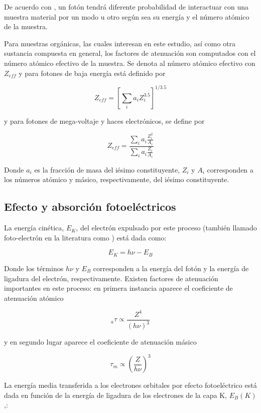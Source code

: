 \documentclass[12pt,letterpaper, oneside]{book}
\begin{document}
	 De acuerdo con \cite{IAEA.2005}, un fotón tendrá diferente probabilidad de interactuar con una muestra material por un modo u otro según sea su energía y el número atómico de la muestra. 
	 
	 Para muestras orgánicas, las cuales interesan en este estudio, así como otra sustancia compuesta en general, los factores de atenuación son computados con el número atómico efectivo de la muestra\cite{IAEA.2005}. Se denota al número atómico efectivo con $Z_{eff}$ y para fotones de baja energía está definido por
	 
	 \begin{equation}
	 	Z_{eff}=\left[\sum_{i}a_i Z_i^{3.5}\right]^{1/3.5}\label{numero_atomico_efectivo}
	 \end{equation}
	 
	 y para fotones de mega-voltaje y haces electrónicos, se define por
	 
	 \begin{equation}
	 	Z_{eff}=\frac{\sum_{i}a_i \frac{Z_i^2}{A_i}}{\sum_{i}a_i \frac{Z_i}{A_i}}
	 \end{equation}
	 
	 Donde $a_i$ es la fracción de masa del iésimo constituyente, $Z_i$ y $A_i$ corresponden a los números atómico y másico, respectivamente, del iésimo constituyente. 
	 
	 \subsection{Efecto y absorción fotoeléctricos}
	 La energía cinética, $E_K$, del electrón expulsado por este proceso (también llamado foto-electrón en la literatura como \cite{IAEA.2005,Mayles.2007}) está dada como:
	 
	 \begin{equation}
	 	E_K=h\nu - E_B
	 \end{equation}
	 
	 Donde los términos $h\nu$ y $E_B$ corresponden a la energía del fotón y la energía de ligadura del electrón, respectivamente. Existen factores de atenuación importantes en este proceso: en primera instancia aparece el coeficiente de atenuación atómico 
	 
	 $$_a\tau \propto \frac{Z^4}{(h\nu)^3}$$
	 
	 y en segundo lugar aparece el coeficiente de atenuación másico
	 
	 $$\tau_m \propto \left(\frac{Z}{h\nu}\right)^3$$
	 
	 La energía media transferida a los electrones orbitales por efecto fotoeléctrico está dada en función de la energía de ligadura de los electrones de la capa K, $E_B(K)$,:
	 
\end{document}
